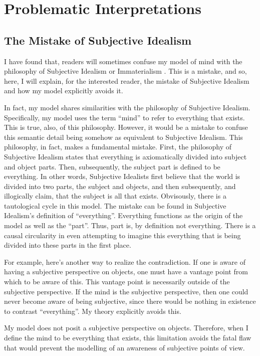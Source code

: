 \chapter{Problematic Interpretations}
\label{chapter:problematic_interpretations}

\section{The Mistake of Subjective Idealism}
\label{section:the_mistake_of_subjective_idealism}

I have found that, readers will sometimes confuse my model of mind
with the philosophy of Subjective Idealism or Immaterialism
\citep{berkeley:1734}.  This is a mistake, and so, here, I will
explain, for the interested reader, the mistake of Subjective Idealism
and how my model explicitly avoids it.

In fact, my model shares similarities with the philosophy of
Subjective Idealism.  Specifically, my model uses the term ``mind'' to
refer to everything that exists.  This is true, also, of this
philosophy.  However, it would be a mistake to confuse this semantic
detail being somehow as equivalent to Subjective Idealism.  This
philosophy, in fact, makes a fundamental mistake.  First, the
philosophy of Subjective Idealism states that everything is
axiomatically divided into subject and object parts.  Then,
subsequently, the subject part is defined to be everything.  In other
words, Subjective Idealists first believe that the world is divided
into two parts, the subject and objects, and then subsequently, and
illogically claim, that the subject is all that exists.  Obvisously,
there is a tautological cycle in this model.  The mistake can be found
in Subjective Idealism's definition of ``everything''.  Everything
functions as the origin of the model as well as the ``part''.  Thus,
part is, by definition not everything.  There is a causal circularity
in even attempting to imagine this everything that is being divided
into these parts in the first place.

For example, here's another way to realize the contradiction.  If one
is aware of having a subjective perspective on objects, one must have
a vantage point from which to be aware of this.  This vantage point is
necessarily outside of the subjective perspective.  If the mind is the
subjective perspective, then one could never become aware of being
subjective, since there would be nothing in existence to contrast
``everything''.  My theory explicitly avoids this.

My model does not posit a subjective perspective on objects.
Therefore, when I define the mind to be everything that exists, this
limitation avoids the fatal flaw that would prevent the modelling of
an awareness of subjective points of view.

